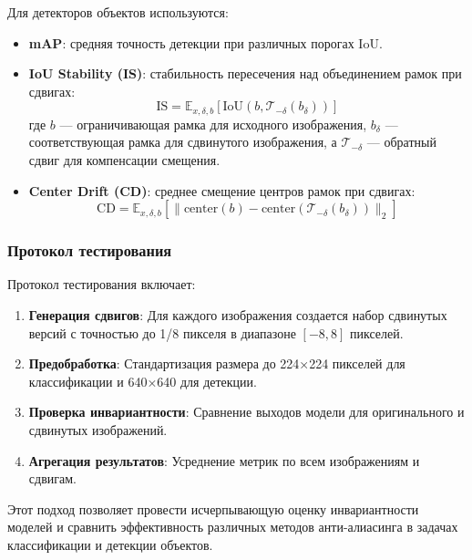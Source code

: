 Для детекторов объектов используются:

\begin{itemize}
    \item \textbf{mAP}: средняя точность детекции при различных порогах IoU.
    
    \item \textbf{IoU Stability (IS)}: стабильность пересечения над объединением рамок при сдвигах:
    \begin{equation}
    \text{IS} = \mathbb{E}_{x, \delta, b} \left[ \text{IoU} \left( b, \mathcal{T}_{-\delta}(b_{\delta}) \right) \right]
    \end{equation}
    где $b$ — ограничивающая рамка для исходного изображения, $b_{\delta}$ — соответствующая рамка для сдвинутого изображения, а $\mathcal{T}_{-\delta}$ — обратный сдвиг для компенсации смещения.
    
    \item \textbf{Center Drift (CD)}: среднее смещение центров рамок при сдвигах:
    \begin{equation}
    \text{CD} = \mathbb{E}_{x, \delta, b} \left[ \| \text{center}(b) - \text{center}(\mathcal{T}_{-\delta}(b_{\delta})) \|_2 \right]
    \end{equation}
\end{itemize}

\subsubsection{Протокол тестирования}
\label{sec:evaluation:protocol}

Протокол тестирования включает:

\begin{enumerate}
    \item \textbf{Генерация сдвигов}: Для каждого изображения создается набор сдвинутых версий с точностью до 1/8 пикселя в диапазоне $[-8, 8]$ пикселей.
    
    \item \textbf{Предобработка}: Стандартизация размера до 224×224 пикселей для классификации и 640×640 для детекции.
    
    \item \textbf{Проверка инвариантности}: Сравнение выходов модели для оригинального и сдвинутых изображений.
    
    \item \textbf{Агрегация результатов}: Усреднение метрик по всем изображениям и сдвигам.
\end{enumerate}

Этот подход позволяет провести исчерпывающую оценку инвариантности моделей и сравнить эффективность различных методов анти-алиасинга в задачах классификации и детекции объектов.

\newpage
